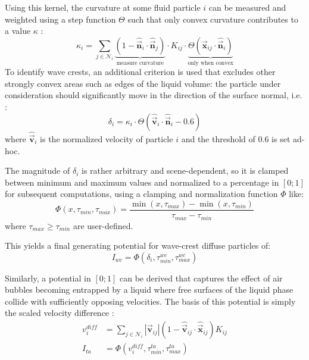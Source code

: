 \documentclass[oneside, a4paper]{book}
\newcounter{phase}[algorithm]
\newcommand\abs[1]{\left|#1\right|}
\newcommand\vek[1]{\vec{\bm{#1}}}
\newcommand\br[1]{\left(#1\right)}
\begin{document}
  Using this kernel, the curvature at some fluid particle $i$ can be measured and weighted using a step function $\Theta$ such that only convex curvature contributes to a value $\kappa$ \autocites{spray-foam-bubbles}{turbulent-micropolar-foam}:
  \begin{equation}
    \kappa_i = \sum_{j\in\mathcal{N}_i} 
    \underbrace{\br{1-\hat{\vek{n}}_i \cdot \hat{\vek{n}}_j}}_{\text{measure curvature}} 
    \cdot 
    K_{ij}\cdot 
    \underbrace{\Theta\br{\vek{x}_{ij}\cdot \hat{\vek{n}}_i}}_{\text{only when convex}}
  \end{equation}
  To identify wave crests, an additional criterion is used that excludes other strongly convex areas such as edges of the liquid volume: the particle under consideration should significantly move in the direction of the surface normal, i.e. \autocite{spray-foam-bubbles}:
  \begin{equation}
    \delta_i = \kappa_i \cdot \Theta\br{\hat{\vek{v}}_{i} \cdot \hat{\vek{n}}_i - 0.6}
  \end{equation}
  where $\hat{\vek{v}}_{i}$ is the normalized velocity of particle $i$ and the threshold of $0.6$ is set ad-hoc.

  The magnitude of $\delta_i$ is rather arbitrary and scene-dependent, so it is clamped between minimum and maximum values and normalized to a percentage in $[0;1]$ for subsequent computations, using a clamping and normalization function $\Phi$ like:
  \begin{equation}\label{eq:foam-normalization-phi}
    \Phi\br{x,\tau_{min},\tau_{max}} = \frac{\min\br{x, \tau_{max}} - \min\br{x, \tau_{min}}}{\tau_{max}-\tau_{min}}
  \end{equation}
  where $\tau_{max}\geq\tau_{min}$ are user-defined. 

  This yields a final generating potential for wave-crest diffuse particles of:
  \begin{equation}
    I_{wc} = \Phi(\delta_i,\tau_{min}^{wc}, \tau_{max}^{wc})
  \end{equation}

  Similarly, a potential in $[0;1]$ can be derived that captures the effect of air bubbles becoming entrapped by a liquid where free surfaces of the liquid phase collide with sufficiently opposing velocities. The basis of this potential is simply the scaled velocity difference \autocite{spray-foam-bubbles}:
  \begin{align}
    v_i^{diff} &= \sum_{j\in\mathcal{N}_i} \abs{\vek{v}_{ij}} \br{1-\hat{\vek{v}}_{ij}\cdot \hat{\vek{x}}_{ij}} K_{ij}\\
    I_{ta} &= \Phi(v_i^{diff}, \tau_{min}^{ta}, \tau_{max}^{ta})
  \end{align}
\end{document}
